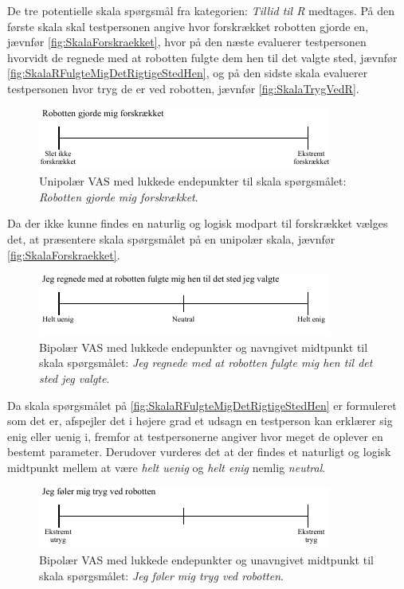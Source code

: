 %
De tre potentielle skala spørgsmål fra kategorien: \textit{Tillid til R} medtages. På den første skala skal testpersonen angive hvor forskrækket robotten gjorde en, jævnfør \autoref{fig:SkalaForskraekket}, hvor på den næste evaluerer testpersonen hvorvidt de regnede med at robotten fulgte dem hen til det valgte sted, jævnfør \autoref{fig:SkalaRFulgteMigDetRigtigeStedHen}, og på den sidste skala evaluerer testpersonen hvor tryg de er ved robotten, jævnfør \autoref{fig:SkalaTrygVedR}.
%
\begin{figure}[H]
\centering
\includegraphics[width =\textwidth]{Figure/UdvalgteSkalaer/Forskraekket} 
\caption{Unipolær VAS med lukkede endepunkter til skala spørgsmålet: \textit{Robotten gjorde mig forskrækket}.}
\label{fig:SkalaForskraekket}
\end{figure}
\noindent
%
Da der ikke kunne findes en naturlig og logisk modpart til forskrækket vælges det, at præsentere skala spørgsmålet på en unipolær skala, jævnfør \autoref{fig:SkalaForskraekket}. 
%
\begin{figure}[H]
\centering
\includegraphics[width =\textwidth]{Figure/UdvalgteSkalaer/RobottenFulgteMigDetRigtigeStedHen} 
\caption{Bipolær VAS med lukkede endepunkter og navngivet midtpunkt til skala spørgsmålet: \textit{Jeg regnede med at robotten fulgte mig hen til det sted jeg valgte}.}
\label{fig:SkalaRFulgteMigDetRigtigeStedHen}
\end{figure}
\noindent
%
Da skala spørgsmålet på \autoref{fig:SkalaRFulgteMigDetRigtigeStedHen} er formuleret som det er, afspejler det i højere grad et udsagn en testperson kan erklærer sig enig eller uenig i, fremfor at testpersonerne angiver hvor meget de oplever en bestemt parameter. Derudover vurderes det at der findes et naturligt og logisk midtpunkt mellem at være \textit{helt uenig} og \textit{helt enig} nemlig \textit{neutral}.  
%
\begin{figure}[H]
\centering
\includegraphics[width =\textwidth]{Figure/UdvalgteSkalaer/TrygVedR} 
\caption{Bipolær VAS med lukkede endepunkter og unavngivet midtpunkt til skala spørgsmålet: \textit{Jeg føler mig tryg ved robotten}.}
\label{fig:SkalaTrygVedR}
\end{figure}
